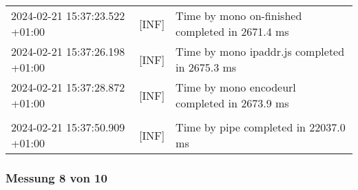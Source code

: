 {{\begin{tabularx}{\textwidth}{|l|l|X|}
                    2024-02-21 15:37:23.522 +01:00 & [INF] & Time by mono on-finished completed in 2671.4 ms \\
                    2024-02-21 15:37:26.198 +01:00 & [INF] & Time by mono ipaddr.js completed in 2675.3 ms \\
                    2024-02-21 15:37:28.872 +01:00 & [INF] & Time by mono encodeurl completed in 2673.9 ms \\
                    & & \\
                    2024-02-21 15:37:50.909 +01:00 & [INF] & Time by pipe completed in 22037.0 ms \\
                    \hline
                \end{tabularx}
            }
        }

    \subsubsection*{Messung 8 von 10} \label{subsubsec:LiteDbMehrPaketeAlsDb8von10}
